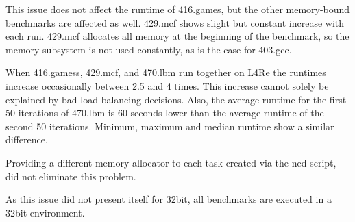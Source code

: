 This issue does not affect the runtime of 416.games, but the other memory-bound
benchmarks are affected as well.
429.mcf shows slight but constant increase with each run.
429.mcf allocates all memory at the beginning of the benchmark, so the memory
subsystem is not used constantly, as is the case for 403.gcc.

When 416.gamess, 429.mcf, and 470.lbm run together on L4Re the runtimes
increase occasionally between 2.5 and 4 times.
This increase cannot solely be explained by bad load balancing decisions.
Also, the average runtime for the first 50 iterations of 470.lbm is 60 seconds
lower than the average runtime of the second 50 iterations.
Minimum, maximum and median runtime show a similar difference.

Providing a different memory allocator to each task created via the ned script,
did not eliminate this problem.

As this issue did not present itself for 32bit, all benchmarks are executed
in a 32bit environment.


\begin{comment}
\paragraph{Benchmarks.}
SPEC progs:
solo runs: SLD, STB, MIPC, CFS
group runs: SLD, STB, MIPC, CFS
--> degradation of median compared  to solo runs

Group runs for different SMT algos: RR, load,
Group runs for different MIPC assignments: load, mpc-ipc

pingpong  clsvr group;
openmp-mmul distribution group; -- load generated by other mmul or fractal



\paragraph{Group Configuration Benchmarks}
The first is a simple \gls{ipc} ping-pong, where the server answers a call from
the client with the number of the core it is currently running on.
The client measures the time for the \gls{ipc} call and prints the answer of
the server together with its own core number and the \gls{ipc} duration.

\end{comment}
